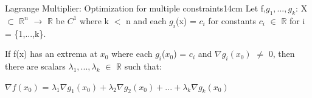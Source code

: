    \begin{wtheorem}{Lagrange Multiplier: Optimization for multiple constraints}{14cm}
        Let f,$g_1,...,g_k$: X $\subset$ $\mathbb{R}^n$ $\rightarrow$ $\mathbb{R}$
        be $C^1$ where k $<$ n and each $g_i$(x) = $c_i$ for constants
        $c_i$ $\in$ $\mathbb{R}$ for i = \{1,...,k\}.
        
        If f(x) has an extrema at $x_0$ where each $g_i$($x_0$) = $c_i$ and
        $\nabla g_i(x_0)$ $\not =$ 0, then there are scalars
        $\lambda_1,...,\lambda_k$ $\in$ $\mathbb{R}$ such that:

        \hspace{0.5cm}
        $\nabla f(x_0)$ = $\lambda_1 \nabla g_1(x_0)
                            + \lambda_2 \nabla g_2(x_0)
                            + ... + \lambda_k \nabla g_k(x_0)$
    \end{wtheorem}




